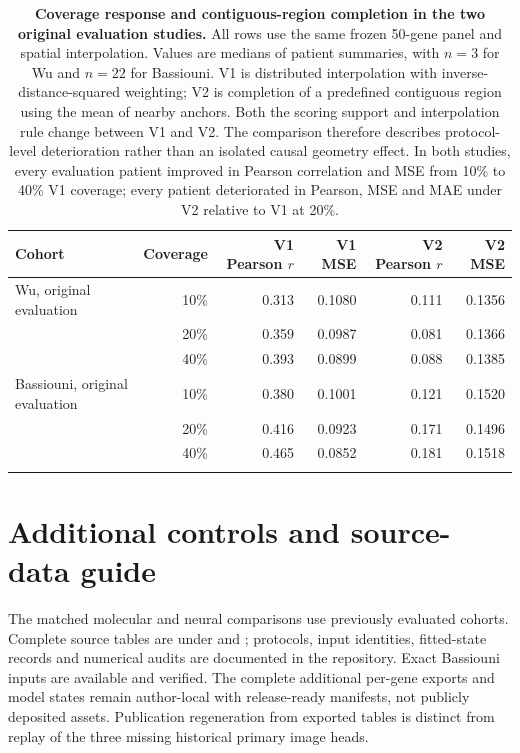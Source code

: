 \clearpage
\begin{table}[!htbp]
\caption{\textbf{Coverage response and contiguous-region completion in the two original evaluation studies.} All rows use the same frozen 50-gene panel and spatial interpolation. Values are medians of patient summaries, with $n=3$ for Wu and $n=22$ for Bassiouni. V1 is distributed interpolation with inverse-distance-squared weighting; V2 is completion of a predefined contiguous region using the mean of nearby anchors. Both the scoring support and interpolation rule change between V1 and V2. The comparison therefore describes protocol-level deterioration rather than an isolated causal geometry effect. In both studies, every evaluation patient improved in Pearson correlation and MSE from 10\% to 40\% V1 coverage; every patient deteriorated in Pearson, MSE and MAE under V2 relative to V1 at 20\%.}
\label{tab:coverage}
\centering\small
\begin{tabularx}{\textwidth}{@{}Yrrrrr@{}}
\toprule
Cohort & Coverage & V1 Pearson $r$ & V1 MSE & V2 Pearson $r$ & V2 MSE \\
\midrule
Wu, original evaluation & 10\% & 0.313 & 0.1080 & 0.111 & 0.1356 \\
 & 20\% & 0.359 & 0.0987 & 0.081 & 0.1366 \\
 & 40\% & 0.393 & 0.0899 & 0.088 & 0.1385 \\
\addlinespace[5pt]
Bassiouni, original evaluation & 10\% & 0.380 & 0.1001 & 0.121 & 0.1520 \\
 & 20\% & 0.416 & 0.0923 & 0.171 & 0.1496 \\
 & 40\% & 0.465 & 0.0852 & 0.181 & 0.1518 \\
\addlinespace[5pt]
\bottomrule
\end{tabularx}
\end{table}


\clearpage
\section{Additional controls and source-data guide}
The matched molecular and neural comparisons use previously evaluated cohorts. Complete source tables are under  and ; protocols, input identities, fitted-state records and numerical audits are documented in the repository. Exact Bassiouni inputs are available and verified. The complete additional per-gene exports and model states remain author-local with release-ready manifests, not publicly deposited assets. Publication regeneration from exported tables is distinct from replay of the three missing historical primary image heads.

